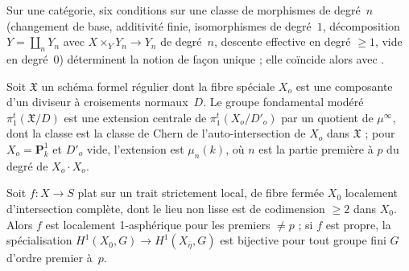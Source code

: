 \begin{encadre}
\begin{theoreme*}\nonverifie
Sur une catégorie, six conditions sur une classe de morphismes de degré~$n$ (changement de base, additivité finie, isomorphismes de degré~$1$, décomposition $Y = \coprod_n Y_n$ avec $X \times_Y Y_n \to Y_n$ de degré~$n$, descente effective en degré $\geq 1$, vide en degré~$0$) déterminent la notion de façon unique ; elle coïncide alors avec .
\end{theoreme*}
\end{encadre}

\begin{encadre}
\begin{theoreme*}\nonverifie
Soit $\mathfrak X$ un schéma formel régulier dont la fibre spéciale $X_o$ est une composante d'un diviseur à croisements normaux~$D$. Le groupe fondamental modéré $\pi_1^t(\mathfrak X/D)$ est une extension centrale de $\pi_1^t(X_o/D'_o)$ par un quotient de $\mu^\infty$, dont la classe est la classe de Chern de l'auto-intersection de $X_o$ dans $\mathfrak X$ ; pour $X_o = \mathbf P^1_k$ et $D'_o$ vide, l'extension est $\mu_n(k)$, où $n$ est la partie première à $p$ du degré de $X_o \cdot X_o$.
\end{theoreme*}
\end{encadre}

\begin{encadre}
\begin{theoreme*}\nonverifie
Soit $f : X \to S$ plat sur un trait strictement local, de fibre fermée $X_0$ localement d'intersection complète, dont le lieu non lisse est de codimension $\geq 2$ dans $X_0$. Alors $f$ est localement 1-asphérique pour les premiers $\neq p$ ; si $f$ est propre, la spécialisation $H^1(X_0, G) \to H^1(X_{\bar\eta}, G)$ est bijective pour tout groupe fini $G$ d'ordre premier à~$p$.
\end{theoreme*}
\end{encadre}


